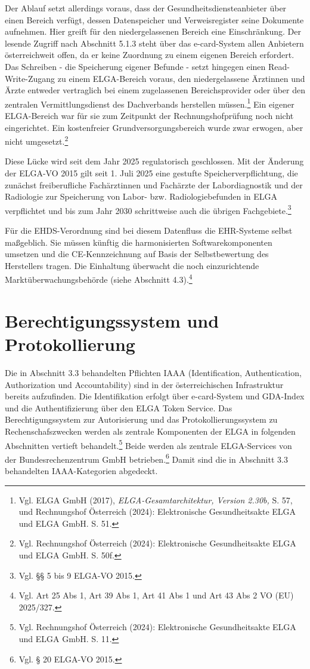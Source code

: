 Der Ablauf setzt allerdings voraus, dass der Gesundheitsdiensteanbieter über einen Bereich verfügt, dessen Datenspeicher und Verweisregister seine Dokumente aufnehmen. Hier greift für den niedergelassenen Bereich eine Einschränkung. Der lesende Zugriff nach Abschnitt 5.1.3 steht über das e-card-System allen Anbietern österreichweit offen, da er keine Zuordnung zu einem eigenen Bereich erfordert. Das Schreiben - die Speicherung eigener Befunde - setzt hingegen einen Read-Write-Zugang zu einem ELGA-Bereich voraus, den niedergelassene Ärztinnen und Ärzte entweder vertraglich bei einem zugelassenen Bereichsprovider oder über den zentralen Vermittlungsdienst des Dachverbands herstellen müssen.\footnote{Vgl. ELGA GmbH (2017), \textit{ELGA-Gesamtarchitektur, Version 2.30b,} S. 57, und Rechnungshof Österreich (2024): Elektronische Gesundheitsakte ELGA und ELGA GmbH. S. 51.} Ein eigener ELGA-Bereich war für sie zum Zeitpunkt der Rechnungshofprüfung noch nicht eingerichtet. Ein kostenfreier Grundversorgungsbereich wurde zwar erwogen, aber nicht umgesetzt.\footnote{Vgl. Rechnungshof Österreich (2024): Elektronische Gesundheitsakte ELGA und ELGA GmbH. S. 50f.}

Diese Lücke wird seit dem Jahr 2025 regulatorisch geschlossen. Mit der Änderung der ELGA-VO 2015 gilt seit 1. Juli 2025 eine gestufte Speicherverpflichtung, die zunächst freiberufliche Fachärztinnen und Fachärzte der Labordiagnostik und der Radiologie zur Speicherung von Labor- bzw. Radiologiebefunden in ELGA verpflichtet und bis zum Jahr 2030 schrittweise auch die übrigen Fachgebiete.\footnote{Vgl. §§ 5 bis 9 ELGA-VO 2015.}

Für die EHDS-Verordnung sind bei diesem Datenfluss die EHR-Systeme selbst maßgeblich. Sie müssen künftig die harmonisierten Softwarekomponenten umsetzen und die CE-Kennzeichnung auf Basis der Selbstbewertung des Herstellers tragen. Die Einhaltung überwacht die noch einzurichtende Marktüberwachungsbehörde (siehe Abschnitt 4.3).\footnote{Vgl. Art 25 Abs 1, Art 39 Abs 1, Art 41 Abs 1 und Art 43 Abs 2 VO (EU) 2025/327.}


\section{Berechtigungssystem und Protokollierung}

Die in Abschnitt 3.3 behandelten Pflichten IAAA (Identification, Authentication, Authorization und Accountability) sind in der österreichischen Infrastruktur bereits aufzufinden. Die Identifikation erfolgt über e-card-System und GDA-Index und die Authentifizierung über den ELGA Token Service.
Das Berechtigungssystem zur Autorisierung und das Protokollierungssystem zu Rechenschafszwecken werden als zentrale Komponenten der ELGA in folgenden Abschnitten vertieft behandelt.\footnote{Vgl. Rechnungshof Österreich (2024): Elektronische Gesundheitsakte ELGA und ELGA GmbH. S. 11.} Beide werden als zentrale ELGA-Services von der Bundesrechenzentrum GmbH betrieben.\footnote{Vgl. § 20 ELGA-VO 2015.} Damit sind die in Abschnitt 3.3 behandelten IAAA-Kategorien abgedeckt.

